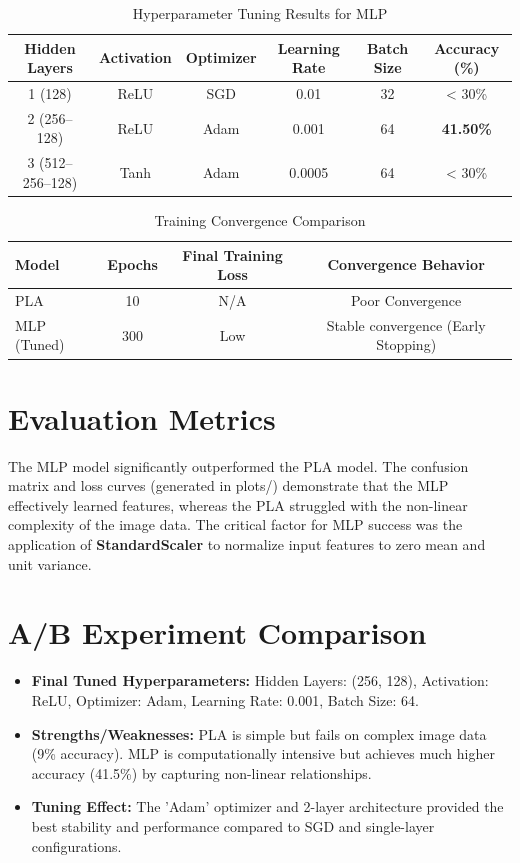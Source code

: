 \documentclass[11pt]{article}
\begin{document}
\begin{table}[h!]
\centering
\caption{Hyperparameter Tuning Results for MLP}
\renewcommand{\arraystretch}{1.3}
\begin{tabular}{cccccc}
\toprule
\textbf{Hidden Layers} & \textbf{Activation} & \textbf{Optimizer} & \textbf{Learning Rate} & \textbf{Batch Size} & \textbf{Accuracy (\%)} \\
\midrule
1 (128) & ReLU & SGD & 0.01 & 32 & < 30\% \\
2 (256--128) & ReLU & Adam & 0.001 & 64 & \textbf{41.50\%} \\
3 (512--256--128) & Tanh & Adam & 0.0005 & 64 & < 30\% \\
\bottomrule
\end{tabular}
\end{table}

\begin{table}[h!]
\centering
\caption{Training Convergence Comparison}
\renewcommand{\arraystretch}{1.3}
\begin{tabular}{lccc}
\toprule
\textbf{Model} & \textbf{Epochs} & \textbf{Final Training Loss} & \textbf{Convergence Behavior} \\
\midrule
PLA & 10 & N/A & Poor Convergence \\
MLP (Tuned) & 300 & Low & Stable convergence (Early Stopping) \\
\bottomrule
\end{tabular}
\end{table}

\section*{Evaluation Metrics}
The MLP model significantly outperformed the PLA model. The confusion matrix and loss curves (generated in plots/) demonstrate that the MLP effectively learned features, whereas the PLA struggled with the non-linear complexity of the image data. The critical factor for MLP success was the application of \textbf{StandardScaler} to normalize input features to zero mean and unit variance.

\section*{A/B Experiment Comparison}
\begin{itemize}
    \item \textbf{Final Tuned Hyperparameters:} Hidden Layers: (256, 128), Activation: ReLU, Optimizer: Adam, Learning Rate: 0.001, Batch Size: 64.
    \item \textbf{Strengths/Weaknesses:} PLA is simple but fails on complex image data (9\% accuracy). MLP is computationally intensive but achieves much higher accuracy (41.5\%) by capturing non-linear relationships.
    \item \textbf{Tuning Effect:} The 'Adam' optimizer and 2-layer architecture provided the best stability and performance compared to SGD and single-layer configurations.
\end{itemize}
\end{document}
